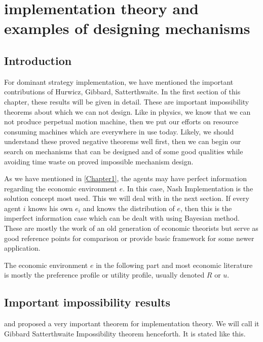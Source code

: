 
\chapter{implementation theory and examples of designing mechanisms  }  %

\label{Chapter2} %




\section{Introduction}
For dominant strategy implementation, we have mentioned the important
contributions of Hurwicz, Gibbard, Satterthwaite. In the first section
of this chapter, these results will be given in detail. These are
important impossibility theorems about which we can not design. Like
in physics, we know that we can not produce perpetual motion machine,
then we put our efforts on resource consuming machines which are
everywhere in use today. Likely, we should understand these proved
negative theorems well first, then we can begin our search on
mechanisms that can be designed and of some good qualities while
avoiding time waste on proved impossible mechanism design.


As we have mentioned in \ref{Chapter1}, the agents may have perfect
information regarding the economic environment $e$. In this case, Nash
Implementation is the solution concept most used. This we will deal
with in the next section.  If every agent $i$ knows his own $e_i$ and
knows the distribution of $e$, then this is the imperfect information
case which can be dealt with using Bayesian method.  These are mostly the
work of an old generation of  economic theorists but serve as good
reference points for comparison or provide basic
framework for some newer application. 

The economic environment $e$ in the following part and most economic literature is mostly the preference profile or utility profile, usually denoted $R$ or $u$.
\section{Important impossibility results}
\parencite{Gibbard1973} and \parencite{Satterthwaite1975} proposed a very important theorem for implementation theory. We will call it 
Gibbard Satterthwaite Impossibility theorem henceforth. It is stated like this.

